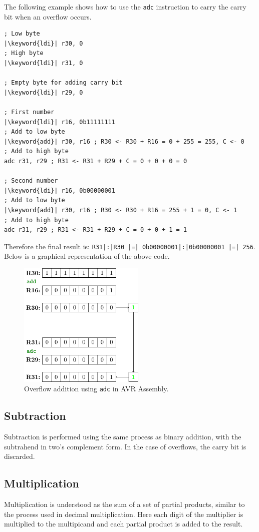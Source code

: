 \documentclass{report}
\newcommand{\keyword}[1]{\textcolor[rgb]{0.00,0.50,0.00}{\textbf{#1}}}
\begin{document}
The following example shows how to use the \texttt{adc} instruction to carry the carry bit when an overflow occurs.
\begin{verbatim}
; Low byte
|\keyword{ldi}| r30, 0
; High byte
|\keyword{ldi}| r31, 0

; Empty byte for adding carry bit
|\keyword{ldi}| r29, 0

; First number
|\keyword{ldi}| r16, 0b11111111
; Add to low byte
|\keyword{add}| r30, r16 ; R30 <- R30 + R16 = 0 + 255 = 255, C <- 0
; Add to high byte
adc r31, r29 ; R31 <- R31 + R29 + C = 0 + 0 + 0 = 0

; Second number
|\keyword{ldi}| r16, 0b00000001
; Add to low byte
|\keyword{add}| r30, r16 ; R30 <- R30 + R16 = 255 + 1 = 0, C <- 1
; Add to high byte
adc r31, r29 ; R31 <- R31 + R29 + C = 0 + 0 + 1 = 1
\end{verbatim}
Therefore the final result is: \texttt{R31|:|R30 |=| 0b00000001|:|0b00000001 |=| 256}.
Below is a graphical representation of the above code.
\begin{figure}[H]
    \centering
    \includegraphics[height = 6cm, keepaspectratio = true]{figures/adc.pdf}
    \caption{Overflow addition using \texttt{adc} in AVR Assembly.} %
\end{figure}
\subsection{Subtraction}
Subtraction is performed using the same process as binary addition, with the
subtrahend in two's complement form.
In the case of overflows, the carry bit is discarded.
\subsection{Multiplication}
Multiplication is understood as the sum of a set of partial products, similar to the process used in decimal multiplication.
Here each digit of the multiplier is multiplied to the multipicand and each partial product is added to the result.
\end{document}
